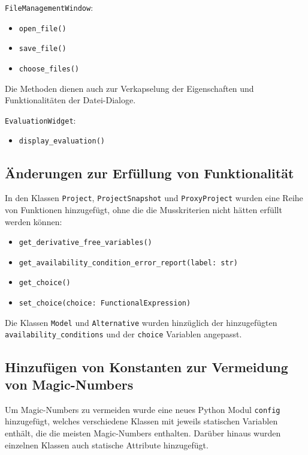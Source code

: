 \documentclass{article}
\newcommand{\classref}[1]{\texttt{#1}}
\begin{document}
\classref{FileManagementWindow}:
\begin{itemize}
    \item \texttt{open\_file()}
    \item \texttt{save\_file()}
    \item \texttt{choose\_files()}
\end{itemize}
Die Methoden dienen auch zur Verkapselung der Eigenschaften und Funktionalitäten der Datei-Dialoge. \newline

\classref{EvaluationWidget}:
  \begin{itemize}
    \item \texttt{display\_evaluation()}
\end{itemize}

\subsection{Änderungen zur Erfüllung von Funktionalität}

In den Klassen \classref{Project}, \classref{ProjectSnapshot} und \classref{ProxyProject} wurden eine Reihe von Funktionen hinzugefügt, ohne die die Musskriterien nicht hätten erfüllt werden können:
\begin{itemize}
    \item \texttt{get\_derivative\_free\_variables()}
    \item \texttt{get\_availability\_condition\_error\_report(label: str)}
    \item \texttt{get\_choice()}
    \item \texttt{set\_choice(choice: FunctionalExpression)}
    
\end{itemize}

Die Klassen \texttt{Model} und \texttt{Alternative} wurden hinzüglich der hinzugefügten \texttt{availability\_conditions} und der \texttt{choice} Variablen angepasst.

\subsection{Hinzufügen von Konstanten zur Vermeidung von Magic-Numbers}

Um Magic-Numbers zu vermeiden wurde eine neues Python Modul \texttt{config} hinzugefügt, welches verschiedene Klassen mit jeweils statischen Variablen enthält, die die meisten Magic-Numbers enthalten. Darüber hinaus wurden einzelnen Klassen auch statische Attribute hinzugefügt.
\end{document}

